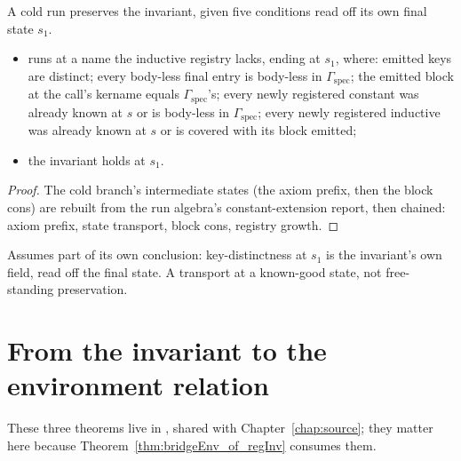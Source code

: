 \begin{lemma}
\label{lem:RegInvShape-prime-register_inductive_run}
\leanok
{}
 A cold  run preserves the invariant, given five conditions
read off its own final state $s_1$.
\begin{itemize}
\item {}  runs at a name the inductive registry lacks, ending at
$s_1$, where: emitted keys are distinct; every body-less final entry is body-less in
$\Gamma_{\mathrm{spec}}$; the emitted block at the call's kername equals $\Gamma_{\mathrm{spec}}$'s;
every newly registered constant was already known at $s$ or is body-less in $\Gamma_{\mathrm{spec}}$;
every newly registered inductive was already known at $s$ or is covered with its block emitted;
\item {} the invariant holds at $s_1$.
\end{itemize}
\end{lemma}
\begin{proof}
\leanok
{}
 The cold branch's intermediate states (the  axiom prefix, then the block
cons) are rebuilt from the run algebra's constant-extension report, then chained: axiom prefix, state
transport, block cons, registry growth.
\end{proof}
\begin{remark}
 Assumes part of its own conclusion: key-distinctness at $s_1$ is the invariant's own
 field, read off the final state. A transport at a known-good state, not free-standing
preservation.
\end{remark}

\section{From the invariant to the environment relation}
\label{sec:coldstart:specenv}

These three theorems live in , shared with Chapter~\ref{chap:source}; they matter
here because Theorem~\ref{thm:bridgeEnv_of_regInv} consumes them.


